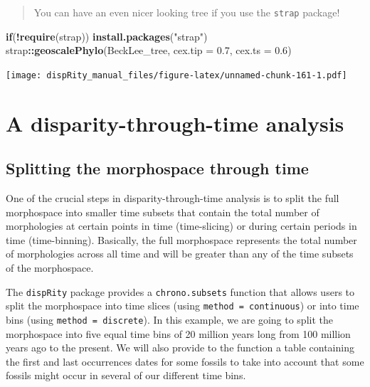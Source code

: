 \documentclass[]{book}
\newenvironment{Shaded}{\begin{snugshade}}{\end{snugshade}}
\newcommand{\ControlFlowTok}[1]{\textcolor[rgb]{0.13,0.29,0.53}{\textbf{#1}}}
\newcommand{\DataTypeTok}[1]{\textcolor[rgb]{0.13,0.29,0.53}{#1}}
\newcommand{\FloatTok}[1]{\textcolor[rgb]{0.00,0.00,0.81}{#1}}
\newcommand{\KeywordTok}[1]{\textcolor[rgb]{0.13,0.29,0.53}{\textbf{#1}}}
\newcommand{\NormalTok}[1]{#1}
\newcommand{\OperatorTok}[1]{\textcolor[rgb]{0.81,0.36,0.00}{\textbf{#1}}}
\newcommand{\StringTok}[1]{\textcolor[rgb]{0.31,0.60,0.02}{#1}}
\begin{document}
\begin{quote}
You can have an even nicer looking tree if you use the \texttt{strap} package!
\end{quote}

\begin{Shaded}
\begin{Highlighting}[]
\ControlFlowTok{if}\NormalTok{(}\OperatorTok{!}\KeywordTok{require}\NormalTok{(strap)) }\KeywordTok{install.packages}\NormalTok{(}\StringTok{"strap"}\NormalTok{)}
\NormalTok{strap}\OperatorTok{::}\KeywordTok{geoscalePhylo}\NormalTok{(BeckLee_tree, }\DataTypeTok{cex.tip =} \FloatTok{0.7}\NormalTok{, }\DataTypeTok{cex.ts =} \FloatTok{0.6}\NormalTok{)}
\end{Highlighting}
\end{Shaded}

\texttt{[image: dispRity\_manual\_files/figure-latex/unnamed-chunk-161-1.pdf]}

\hypertarget{a-disparity-through-time-analysis}{%
\section{A disparity-through-time analysis}\label{a-disparity-through-time-analysis}}

\hypertarget{splitting-the-morphospace-through-time}{%
\subsection{Splitting the morphospace through time}\label{splitting-the-morphospace-through-time}}

One of the crucial steps in disparity-through-time analysis is to split the full morphospace into smaller time subsets that contain the total number of morphologies at certain points in time (time-slicing) or during certain periods in time (time-binning).
Basically, the full morphospace represents the total number of morphologies across all time and will be greater than any of the time subsets of the morphospace.

The \texttt{dispRity} package provides a \texttt{chrono.subsets} function that allows users to split the morphospace into time slices (using \texttt{method\ =\ continuous}) or into time bins (using \texttt{method\ =\ discrete}).
In this example, we are going to split the morphospace into five equal time bins of 20 million years long from 100 million years ago to the present.
We will also provide to the function a table containing the first and last occurrences dates for some fossils to take into account that some fossils might occur in several of our different time bins.
\end{document}
